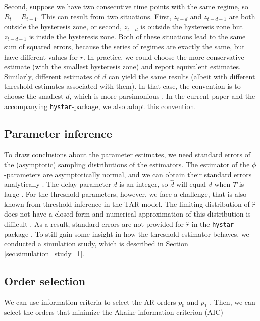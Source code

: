 \documentclass{article}
\begin{document}
Second, suppose we have two consecutive time points with the same regime, so $R_t = R_{t+1}$. This can result from two situations. First, $z_{t - d}$ and $z_{t - d + 1}$ are both outside the hysteresis zone, or second, $z_{t - d}$ is outside the hysteresis zone but $z_{t - d + 1}$ is inside the hysteresis zone. Both of these situations lead to the same sum of squared errors, because the series of regimes are exactly the same, but have different values for $r$.
In practice, we could choose the more conservative estimate (with the smallest hysteresis zone) and report equivalent estimates. Similarly, different estimates of $d$ can yield the same results (albeit with different threshold estimates associated with them). 
In that case, the convention is to choose the smallest $d$, which is more parsimonious \citep{bar2}. In the current paper and the accompanying \texttt{hystar}-package, we also adopt this convention.

\subsection{Parameter inference} \label{sec:parameter_inference}
To draw conclusions about the parameter estimates, we need standard errors of the (asymptotic) sampling distributions of the estimators.
The estimator of the $\phi$-parameters are asymptotically normal, and we can obtain their standard errors analytically \citep{bar2}.
The delay parameter $d$ is an integer, so $\hat{d}$ will equal $d$ when $T$ is large \citep{bar2}.
For the threshold parameters, however, we face a challenge, that is also known from threshold inference in the TAR model. 
The limiting distribution of $\hat{r}$ does not have a closed form and numerical approximation of this distribution is difficult \citep{bar2, li_least_2012}.
As a result, standard errors are not provided for $\hat{r}$ in the \texttt{hystar} package \citep[these are also not provided for the \texttt{mTAR}-function to estimate the standard TAR model in the \textsf{R}-package \texttt{NTS},][]{R_NTS}. 
To still gain some insight in how the threshold estimator behaves, we conducted a simulation study, which is described in Section \ref{sec:simulation_study_1}.

\subsection{Order selection}
\label{sec:selecting_AR_orders}
We can use information criteria to select the AR orders $p_0$ and $p_1$ \citep[see][for an overview of information criteria in the context of threshold models]{information_criteria_tar}. 
Then, we can select the orders that minimize the Akaike information criterion (AIC)
\end{document}
